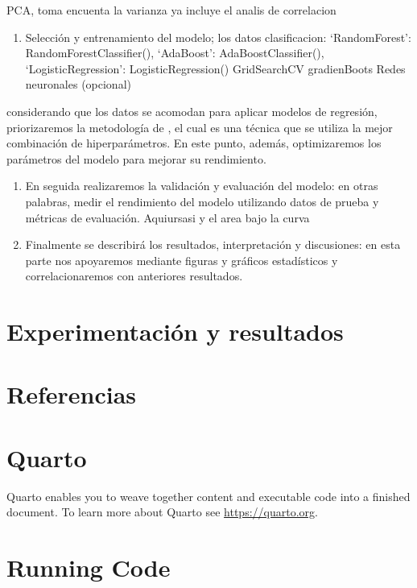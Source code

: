 \documentclass[
  number,
  preprint,
  3p,
  twocolumn]{elsarticle}
\providecommand{\tightlist}{%
  \setlength{\itemsep}{0pt}\setlength{\parskip}{0pt}}\usepackage{longtable,booktabs,array}
\begin{document}
PCA, toma encuenta la varianza ya incluye el analis de correlacion

\begin{enumerate}
\def\labelenumi{\arabic{enumi})}
\setcounter{enumi}{2}
\tightlist
\item
  Selección y entrenamiento del modelo; los datos clasificacion:
  `RandomForest': RandomForestClassifier(), `AdaBoost':
  AdaBoostClassifier(), `LogisticRegression': LogisticRegression()
  GridSearchCV gradienBoots Redes neuronales (opcional)
\end{enumerate}

considerando que los datos se acomodan para aplicar modelos de
regresión, priorizaremos la metodología de , el cual es una técnica que
se utiliza la mejor combinación de hiperparámetros. En este punto,
además, optimizaremos los parámetros del modelo para mejorar su
rendimiento.

\begin{enumerate}
\def\labelenumi{\arabic{enumi})}
\setcounter{enumi}{3}
\item
  En seguida realizaremos la validación y evaluación del modelo: en
  otras palabras, medir el rendimiento del modelo utilizando datos de
  prueba y métricas de evaluación. Aquiursasi y el area bajo la curva
\item
  Finalmente se describirá los resultados, interpretación y discusiones:
  en esta parte nos apoyaremos mediante figuras y gráficos estadísticos
  y correlacionaremos con anteriores resultados.
\end{enumerate}

\section{Experimentación y
resultados}\label{experimentaciuxf3n-y-resultados}

\section{Referencias}\label{referencias}

\section{Quarto}\label{quarto}

Quarto enables you to weave together content and executable code into a
finished document. To learn more about Quarto see
\url{https://quarto.org}.

\section{Running Code}\label{running-code}
\end{document}
